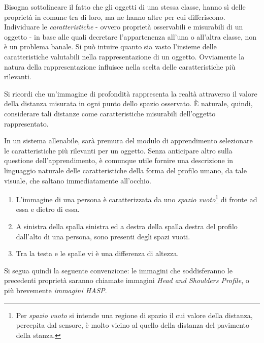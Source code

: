             Bisogna sottolineare il fatto che gli oggetti di una stessa classe, hanno sì delle proprietà in comune tra di loro, ma ne hanno altre per cui differiscono.
            Individuare le \emph{caratteristiche} - ovvero proprietà osservabili e misurabili di un oggetto - in base alle quali decretare l'appartenenza all'una o all'altra classe, non è un problema banale.
            Si può intuire quanto sia vasto l'insieme delle caratteristiche valutabili nella rappresentazione di un oggetto.
            Ovviamente la natura della rappresentazione influisce nella scelta delle caratteristiche più rilevanti.
            
            Si ricordi che un'immagine di profondità rappresenta la realtà attraverso il valore della distanza misurata in ogni punto dello spazio osservato. 
            È naturale, quindi, considerare tali distanze come caratteristiche misurabili dell'oggetto rappresentato.

            In un sistema allenabile, sarà premura del modulo di apprendimento selezionare le caratteristiche più rilevanti per un oggetto.
            Senza anticipare altro sulla questione dell'apprendimento, è comunque utile fornire una descrizione in linguaggio naturale delle caratteristiche della forma del profilo umano, da tale visuale, che saltano immediatamente all'occhio.

            \begin{enumerate}
                \item L'immagine di una persona è caratterizzata da uno \emph{spazio vuoto}\footnote{Per \emph{spazio vuoto} si intende una regione di spazio il cui valore della distanza, percepita dal sensore, è molto vicino al quello della distanza del pavimento della stanza.} di fronte ad essa e dietro di essa.

                \item A sinistra della spalla sinistra ed a destra della spalla destra del profilo dall'alto di una persona, sono presenti degli spazi vuoti.
                
                \item Tra la testa e le spalle vi è una differenza di altezza.
            \end{enumerate}

            Si segua quindi la seguente convenzione: le immagini che soddisferanno le precedenti proprietà saranno chiamate immagini \emph{Head and Shoulders Profile}, o più brevemente \emph{immagini HASP}.


